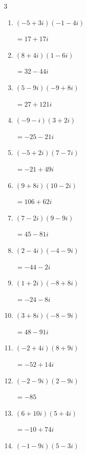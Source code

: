 \begin{multicols}{3}
\begin{enumerate}
  \item $\displaystyle (-5+3i)(-1-4i)$

        $\displaystyle =17+17i$

  \item $\displaystyle (8+4i)(1-6i)$

        $\displaystyle =32-44i$

  \item $\displaystyle (5-9i)(-9+8i)$

        $\displaystyle =27+121i$

  \item $\displaystyle (-9-i)(3+2i)$

        $\displaystyle =-25-21i$

  \item $\displaystyle (-5+2i)(7-7i)$

        $\displaystyle =-21+49i$

\columnbreak %

  \item $\displaystyle (9+8i)(10-2i)$

        $\displaystyle =106+62i$

  \item $\displaystyle (7-2i)(9-9i)$

        $\displaystyle =45-81i$

  \item $\displaystyle (2-4i)(-4-9i)$

        $\displaystyle =-44-2i$

  \item $\displaystyle (1+2i)(-8+8i)$

        $\displaystyle =-24-8i$

  \item $\displaystyle (3+8i)(-8-9i)$

        $\displaystyle =48-91i$

  \item $\displaystyle (-2+4i)(8+9i)$

        $\displaystyle =-52+14i$

  \item $\displaystyle (-2-9i)(2-9i)$

        $\displaystyle =-85$

  \item $\displaystyle (6+10i)(5+4i)$

        $\displaystyle =-10+74i$

  \item $\displaystyle (-1-9i)(5-3i)$


\end{enumerate}
\end{multicols}
